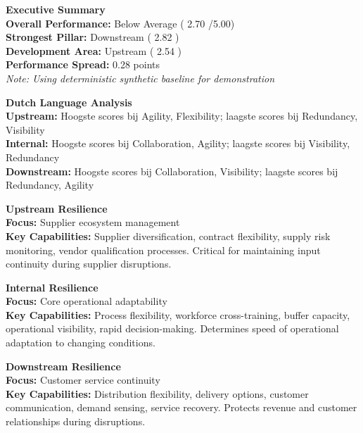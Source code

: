\documentclass[
  oneside,
  open=any,
  fontsize=11pt]{article}
\begin{document}
\begin{minipage}[t]{0.48\textwidth}
\textbf{\large Executive Summary}\\
\textbf{Overall Performance:}  Below Average  ( 2.70 /5.00)\\
\textbf{Strongest Pillar:} Downstream  ( 2.82 )\\
\textbf{Development Area:}  Upstream  ( 2.54 )\\
\textbf{Performance Spread:}  0.28  points\\
\footnotesize\textit{Note: Using deterministic synthetic baseline for demonstration}\\
\end{minipage}\hfill
\begin{minipage}[t]{0.48\textwidth}
\textbf{\large Dutch Language Analysis}\\
\textbf{Upstream:}  Hoogste scores bij Agility, Flexibility; laagste scores bij Redundancy, Visibility \\
\textbf{Internal:}  Hoogste scores bij Collaboration, Agility; laagste scores bij Visibility, Redundancy \\
\textbf{Downstream:}  Hoogste scores bij Collaboration, Visibility; laagste scores bij Redundancy, Agility \\
\end{minipage}

\vspace{0.4cm}

\begin{minipage}[t]{0.32\textwidth}
\textbf{\large Upstream Resilience}\\
\textbf{Focus:} Supplier ecosystem management\\
\textbf{Key Capabilities:} Supplier diversification, contract flexibility, supply risk monitoring, vendor qualification processes. Critical for maintaining input continuity during supplier disruptions.\\
\end{minipage}\hfill
\begin{minipage}[t]{0.32\textwidth}
\textbf{\large Internal Resilience}\\
\textbf{Focus:} Core operational adaptability\\
\textbf{Key Capabilities:} Process flexibility, workforce cross-training, buffer capacity, operational visibility, rapid decision-making. Determines speed of operational adaptation to changing conditions.\\
\end{minipage}\hfill
\begin{minipage}[t]{0.32\textwidth}
\textbf{\large Downstream Resilience}\\
\textbf{Focus:} Customer service continuity\\
\textbf{Key Capabilities:} Distribution flexibility, delivery options, customer communication, demand sensing, service recovery. Protects revenue and customer relationships during disruptions.\\
\end{minipage}
\end{document}
